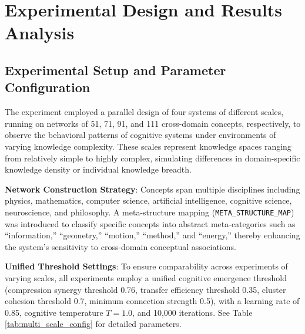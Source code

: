 \documentclass[10pt,onecolumn]{article}
\begin{document}
\section{Experimental Design and Results Analysis}

\subsection{Experimental Setup and Parameter Configuration}

The experiment employed a parallel design of four systems of different scales, running on networks of 51, 71, 91, and 111 cross-domain concepts, respectively, to observe the behavioral patterns of cognitive systems under environments of varying knowledge complexity. These scales represent knowledge spaces ranging from relatively simple to highly complex, simulating differences in domain-specific knowledge density or individual knowledge breadth.

\textbf{Network Construction Strategy}: Concepts span multiple disciplines including physics, mathematics, computer science, artificial intelligence, cognitive science, neuroscience, and philosophy. A meta-structure mapping (\texttt{META\_STRUCTURE\_MAP}) was introduced to classify specific concepts into abstract meta-categories such as “information,” “geometry,” “motion,” “method,” and “energy,” thereby enhancing the system’s sensitivity to cross-domain conceptual associations.

\textbf{Unified Threshold Settings}: To ensure comparability across experiments of varying scales, all experiments employ a unified cognitive emergence threshold (compression synergy threshold 0.76, transfer efficiency threshold 0.35, cluster cohesion threshold 0.7, minimum connection strength 0.5), with a learning rate of 0.85, cognitive temperature $T = 1.0$, and 10,000 iterations. See Table \ref{tab:multi_scale_config} for detailed parameters.
\end{document}
